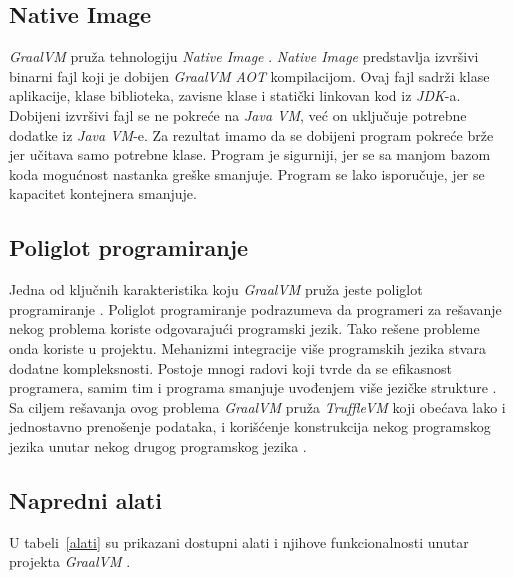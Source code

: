 \documentclass[a4paper]{article}
\begin{document}
\subsection{Native Image}
\label{sub:nim}

\emph{GraalVM} pruža tehnologiju \emph{Native Image} \cite{graalvm}. \emph{Native Image} predstavlja izvršivi binarni fajl koji je dobijen \emph{GraalVM AOT} kompilacijom. Ovaj fajl sadrži klase aplikacije, klase biblioteka, zavisne klase i statički linkovan kod iz \emph{JDK}-a. Dobijeni izvršivi fajl se ne pokreće na \emph{Java VM}, već on uključuje potrebne dodatke iz \emph{Java VM}-e. Za rezultat imamo da se dobijeni program pokreće brže jer učitava samo potrebne klase. Program je sigurniji, jer se sa manjom bazom koda mogućnost nastanka greške smanjuje. Program se lako isporučuje, jer se kapacitet kontejnera smanjuje.

\subsection{Poliglot programiranje}
\label{sub:poliglot}

Jedna od ključnih karakteristika koju \emph{GraalVM} pruža jeste poliglot programiranje \cite{graalvm}. Poliglot programiranje podrazumeva da programeri za rešavanje nekog problema koriste odgovarajući programski jezik. Tako rešene probleme onda koriste u projektu. Mehanizmi integracije više programskih jezika stvara dodatne kompleksnosti. Postoje mnogi radovi koji tvrde da se efikasnost programera, samim tim i programa smanjuje uvođenjem više jezičke strukture \cite{peterson21, hao20}. Sa ciljem rešavanja ovog problema \emph{GraalVM} pruža \emph{TruffleVM} koji obećava lako i jednostavno prenošenje podataka, i korišćenje konstrukcija nekog programskog jezika unutar nekog drugog programskog jezika \cite{grimmer15}.

\subsection{Napredni alati}
\label{sub:alati}

U tabeli~\ref{alati} su prikazani dostupni alati i njihove funkcionalnosti unutar projekta \emph{GraalVM} \cite{graalvm}.
\end{document}
